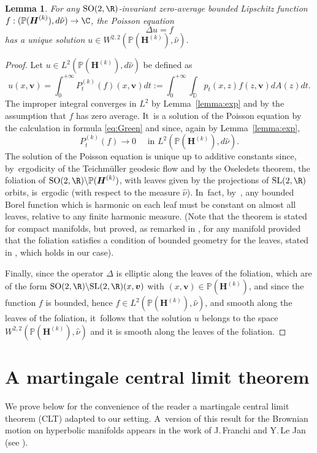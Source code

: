 \documentclass[10pt]{amsart}
\theoremstyle{plain}
\newtheorem{lemma}[thm]{Lemma}
\theoremstyle{definition}
\numberwithin{equation}{subsection}
\newcommand\bD{\mathbb{D}}
\newcommand\bP{\mathbb{P}}
\newcommand{\SL}{\mathrm{SL}}
\newcommand{\SO}{\mathrm{SO}}
\let\laplacian\Delta
\newcommand{\bfH}{\boldsymbol{H}}
\newcommand{\bfv}{\boldsymbol{v}}
\begin{document}
\begin{lemma}\label{lemma:Poisson} For any $\SO(2, \R)$-invariant zero-average bounded Lipschitz function $f:(\bP(\bfH^{(k)}), d\hat{\nu}) \to \C$, the Poisson equation
\[
\laplacian u = f
\]
has a unique solution $u \in W^{2,2}(\bP(\bfH^{(k)}), \hat \nu)$.
\end{lemma}
\begin{proof}
Let $u \in L^2(\bP(\bfH^{(k)}), d\hat{\nu})$ be defined as
\[
u(x,\bfv) = \int_0^{+\infty} P^{(k)}_t(f) (x,\bfv) dt := \int_0^{+\infty} \int_{\bD} p_t(x,z) f(z,\bfv) dA(z) dt.
\]
The improper integral converges in $L^2$ by Lemma~\ref{lemma:exp} and by the assumption that $f$
has zero average. It~is a solution of the Poisson equation by the calculation in formula \eqref{eq:Green}
and since, again by Lemma~\ref{lemma:exp},
\[
P^{(k)}_t(f) \to 0 \quad \text{ in } L^2(\bP(\bfH^{(k)}), d\hat{\nu}).
\]
The solution of the Poisson equation is unique up to additive constants since, by~ergodicity of the Teichmüller geodesic flow and by the Oseledets theorem, the foliation of $\SO(2, \R) \backslash \bP(\bfH^{(k)})$, with leaves given by the projections of $\SL(2, \R)$ orbits, is~ergodic (with respect to the measure $\hat \nu$). In~fact, by~\cite[Th.\,1(b)]{Gar83}, any bounded Borel function which is harmonic on each leaf must be constant on almost all leaves, relative to any finite harmonic measure. (Note that the theorem is stated for compact manifolds, but proved, as remarked in \cite{Gar83}, for
any manifold provided that the foliation satisfies a condition of bounded geometry for the leaves, stated in \hbox{\cite[\S 2]{Gar83}}, which holds in our case).

Finally, since the operator $\laplacian$ is elliptic along the leaves of the foliation, which are of the form $\SO(2, \R) \backslash \SL(2, \R) (x,\bfv)$ with $(x,\bfv)\in \bP(\bfH^{(k)})$, and since the function $f$ is bounded, hence $f \in L^2 (\bP(\bfH^{(k)}), \hat \nu)$, and smooth along the leaves of the foliation, it~follows that the solution $u$ belongs to the space $W^{2,2}(\bP(\bfH^{(k)}), \hat \nu)$ and it is smooth along the leaves of the foliation.
\end{proof}

\section{A martingale central limit theorem}

We prove below for the convenience of the reader a
martingale central limit theorem (CLT) adapted to our setting. A~version of this result for the Brownian motion on hyperbolic manifolds appears in the work of J.\,Franchi and Y.\,Le Jan (see \cite[Lem.\,VIII.7.4]{FL12}).
\end{document}
